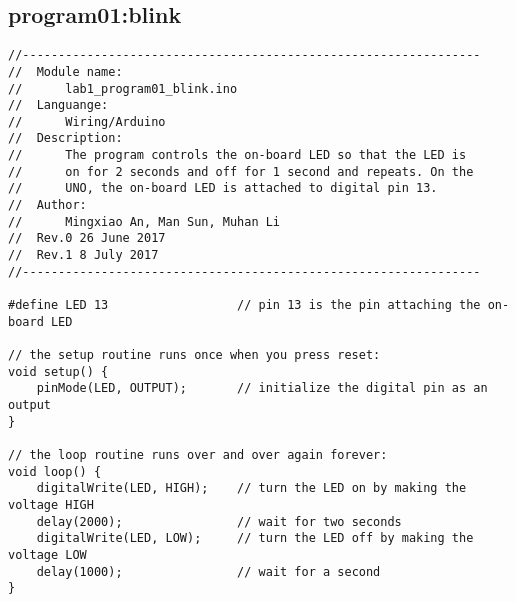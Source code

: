 \subsection{program01:blink}
\begin{verbatim}
//----------------------------------------------------------------
//  Module name:
//      lab1_program01_blink.ino
//  Languange:
//      Wiring/Arduino
//  Description:
//      The program controls the on-board LED so that the LED is 
//      on for 2 seconds and off for 1 second and repeats. On the
//      UNO, the on-board LED is attached to digital pin 13.
//  Author:
//      Mingxiao An, Man Sun, Muhan Li
//  Rev.0 26 June 2017
//  Rev.1 8 July 2017
//----------------------------------------------------------------

#define LED 13                  // pin 13 is the pin attaching the on-board LED

// the setup routine runs once when you press reset:
void setup() {
    pinMode(LED, OUTPUT);       // initialize the digital pin as an output
}

// the loop routine runs over and over again forever:
void loop() {
    digitalWrite(LED, HIGH);    // turn the LED on by making the voltage HIGH
    delay(2000);                // wait for two seconds
    digitalWrite(LED, LOW);     // turn the LED off by making the voltage LOW
    delay(1000);                // wait for a second
}
\end{verbatim}


